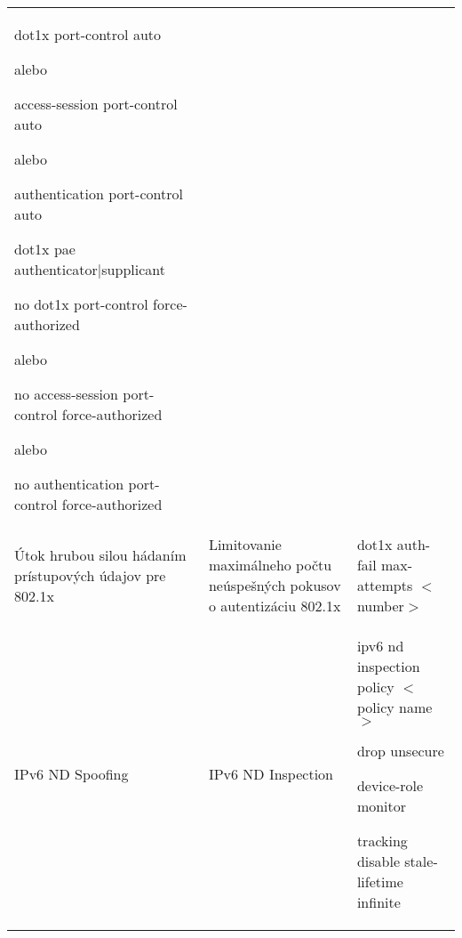 \begin{longtable}[!htbp]{|L{10em}L{10em}>{\selectfont}L{34em}|}
	\hspace{0.5em}dot1x port-control auto
	
	\vspace{0.5em}
	{\selectfont alebo}
	\hspace{0.5em}
	
	\hspace{0.5em}access-session port-control auto
	
	\vspace{0.5em}
	{\selectfont alebo}
	\vspace{0.5em}
	
	\hspace{0.5em}authentication port-control auto
	
	\hspace{0.5em}dot1x pae authenticator|supplicant 
	
	\hspace{0.5em}no dot1x port-control force-authorized
	
	\vspace{0.5em}
	{\selectfont alebo}
	\vspace{0.5em}
	
	\hspace{0.5em}no access-session port-control force-authorized
	
	\vspace{0.5em}
	{\selectfont alebo}
	\vspace{0.5em}
	
	\hspace{0.5em}no authentication port-control force-authorized\\
	
	
	
	Útok hrubou silou hádaním prístupových údajov pre 802.1x 	&Limitovanie maximálneho počtu neúspešných pokusov o autentizáciu 802.1x	&dot1x auth-fail max-attempts $<$number$>$\\
	
	
	
	
	IPv6 ND Spoofing	&IPv6 ND Inspection	&ipv6 nd inspection policy $<$policy name$>$
	
	\hspace{0.5em}drop unsecure
	
	\hspace{0.5em}device-role monitor
	
	\hspace{0.5em}tracking disable stale-lifetime infinite
	

\end{longtable}
